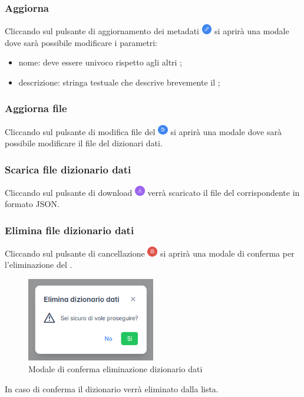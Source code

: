 \subsubsection{Aggiorna }
Cliccando sul pulsante di aggiornamento dei metadati \includegraphics[height=1.2em]{assets/dd_edit_metadata_button.png} si aprirà una modale dove sarà possibile modificare i parametri:
\begin{itemize}
  \item nome: deve essere univoco rispetto agli altri ;
  \item descrizione: stringa testuale che descrive brevemente il ;
\end{itemize}

\subsubsection{Aggiorna file }
Cliccando sul pulsante di modifica file del  \includegraphics[height=1.2em]{assets/dd_edit_button.png} si aprirà una modale dove sarà possibile modificare il file del dizionari dati.

\subsubsection{Scarica file dizionario dati}
Cliccando sul pulsante di download \includegraphics[height=1.2em]{assets/dd_download_button.png} verrà scaricato il file del  corrispondente in formato JSON.

\subsubsection{Elimina file dizionario dati}
Cliccando sul pulsante di cancellazione \includegraphics[height=1.2em]{assets/dd_delete_button.png} si aprirà una modale di conferma per l'eliminazione del .
\begin{figure}[H]
  \centering
  \includegraphics[width=0.5\textwidth]{assets/dd_confirm_delete.png}
  \caption{Modale di conferma eliminazione dizionario dati}
\end{figure}
In caso di conferma il dizionario verrà eliminato dalla lista.

